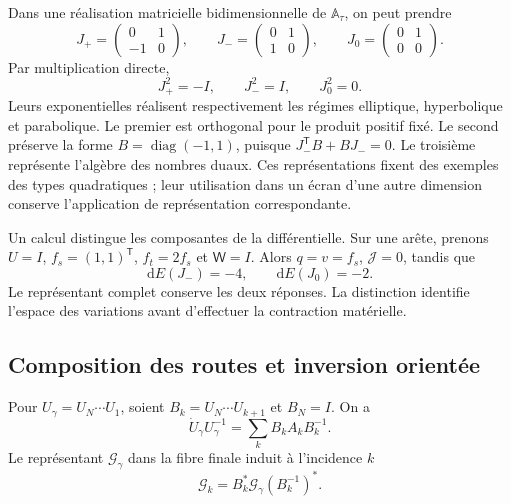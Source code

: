 Dans une réalisation matricielle bidimensionnelle de \(\mathbb A_\tau\), on peut prendre
\[
 J_{+}=\begin{pmatrix}0&1\\-1&0\end{pmatrix},\qquad
 J_{-}=\begin{pmatrix}0&1\\1&0\end{pmatrix},\qquad
 J_{0}=\begin{pmatrix}0&1\\0&0\end{pmatrix}.
\]
Par multiplication directe,
\[
 J_+^2=-I,\qquad J_-^2=I,\qquad J_0^2=0.
\]
Leurs exponentielles réalisent respectivement les régimes elliptique, hyperbolique et parabolique. Le premier est orthogonal pour le produit positif fixé. Le second préserve la forme \(B=\operatorname{diag}(-1,1)\), puisque \(J_-^{\mathsf T}B+BJ_-=0\). Le troisième représente l'algèbre des nombres duaux. Ces représentations fixent des exemples des types quadratiques ; leur utilisation dans un écran d'une autre dimension conserve l'application de représentation correspondante.

Un calcul distingue les composantes de la différentielle. Sur une arête,
prenons \(U=I\), \(f_s=(1,1)^{\mathsf T}\),
\(f_t=2f_s\) et \(\mathsf W=I\). Alors \(q=v=f_s\),
\(\mathcal J=0\), tandis que
\begin{equation}
 \mathrm dE(J_-)=-4,\qquad \mathrm dE(J_0)=-2.
 \label{vii:eq:control-regimenes-corriente}
\end{equation}
Le représentant complet conserve les deux réponses. La distinction
identifie l'espace des variations avant d'effectuer la contraction
matérielle.

\subsection{Composition des routes et inversion orientée}

\begin{proposition}
\label{vii:prop:pullback-invertible}
Pour \(U_\gamma=U_N\cdots U_1\), soient
\(B_k=U_N\cdots U_{k+1}\) et \(B_N=I\). On a
\[
 \dot U_\gamma U_\gamma^{-1}
   =\sum_kB_kA_kB_k^{-1}.
\]
Le représentant \(\mathcal G_\gamma\) dans la fibre finale induit
à l'incidence \(k\)
\begin{equation}
 \mathcal G_k=B_k^*\mathcal G_\gamma(B_k^{-1})^*.
 \label{vii:eq:transporte-contragrediente}
\end{equation}
\end{proposition}

